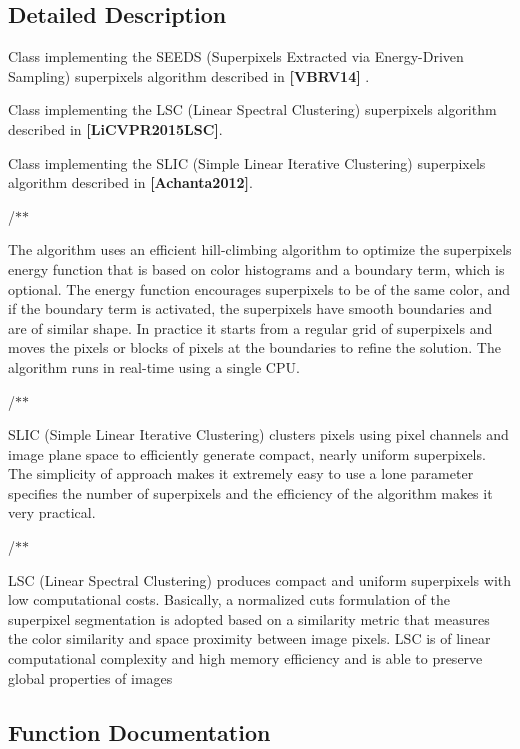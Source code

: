 \subsection{Detailed Description}
Class implementing the S\+E\+E\+DS (Superpixels Extracted via Energy-\/\+Driven Sampling) superpixels algorithm described in {\bfseries [V\+B\+R\+V14]} . 

Class implementing the L\+SC (Linear Spectral Clustering) superpixels algorithm described in {\bfseries [Li\+C\+V\+P\+R2015\+L\+SC]}.

Class implementing the S\+L\+IC (Simple Linear Iterative Clustering) superpixels algorithm described in {\bfseries [Achanta2012]}.

/$\ast$$\ast$

The algorithm uses an efficient hill-\/climbing algorithm to optimize the superpixels\textquotesingle{} energy function that is based on color histograms and a boundary term, which is optional. The energy function encourages superpixels to be of the same color, and if the boundary term is activated, the superpixels have smooth boundaries and are of similar shape. In practice it starts from a regular grid of superpixels and moves the pixels or blocks of pixels at the boundaries to refine the solution. The algorithm runs in real-\/time using a single C\+PU.

/$\ast$$\ast$

S\+L\+IC (Simple Linear Iterative Clustering) clusters pixels using pixel channels and image plane space to efficiently generate compact, nearly uniform superpixels. The simplicity of approach makes it extremely easy to use a lone parameter specifies the number of superpixels and the efficiency of the algorithm makes it very practical. 

/$\ast$$\ast$

L\+SC (Linear Spectral Clustering) produces compact and uniform superpixels with low computational costs. Basically, a normalized cuts formulation of the superpixel segmentation is adopted based on a similarity metric that measures the color similarity and space proximity between image pixels. L\+SC is of linear computational complexity and high memory efficiency and is able to preserve global properties of images 

\subsection{Function Documentation}
\mbox{\label{group__ximgproc__superpixel_ga8bf6750a423a7f806993324e9b1a2276}} 
